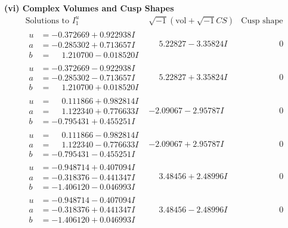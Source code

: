 \documentclass[1p]{elsarticle_modified}
\theoremstyle{definition}
\newcommand{\I}{\sqrt{-1}}
\begin{document}
\newpage\flushleft \textbf{(vi) Complex Volumes and Cusp Shapes}
$$\begin{array}{c|c|c}  
\text{Solutions to }I^u_{1}& \I (\text{vol} + \sqrt{-1}CS) & \text{Cusp shape}\\
 \hline 
\begin{aligned}
u &= -0.372669 + 0.922938 I \\
a &= -0.285302 + 0.713657 I \\
b &= \phantom{-}1.210700 - 0.018520 I\end{aligned}
 & \phantom{-}5.22827 - 3.35824 I & \phantom{-0.000000 } 0 \\ \hline\begin{aligned}
u &= -0.372669 - 0.922938 I \\
a &= -0.285302 - 0.713657 I \\
b &= \phantom{-}1.210700 + 0.018520 I\end{aligned}
 & \phantom{-}5.22827 + 3.35824 I & \phantom{-0.000000 } 0 \\ \hline\begin{aligned}
u &= \phantom{-}0.111866 + 0.982814 I \\
a &= \phantom{-}1.122340 + 0.776633 I \\
b &= -0.795431 + 0.455251 I\end{aligned}
 & -2.09067 - 2.95787 I & \phantom{-0.000000 } 0 \\ \hline\begin{aligned}
u &= \phantom{-}0.111866 - 0.982814 I \\
a &= \phantom{-}1.122340 - 0.776633 I \\
b &= -0.795431 - 0.455251 I\end{aligned}
 & -2.09067 + 2.95787 I & \phantom{-0.000000 } 0 \\ \hline\begin{aligned}
u &= -0.948714 + 0.407094 I \\
a &= -0.318376 - 0.441347 I \\
b &= -1.406120 - 0.046993 I\end{aligned}
 & \phantom{-}3.48456 + 2.48996 I & \phantom{-0.000000 } 0 \\ \hline\begin{aligned}
u &= -0.948714 - 0.407094 I \\
a &= -0.318376 + 0.441347 I \\
b &= -1.406120 + 0.046993 I\end{aligned}
 & \phantom{-}3.48456 - 2.48996 I & \phantom{-0.000000 } 0 \\ \hline\begin{aligned}

\end{aligned}
\end{array}$$
\end{document}
